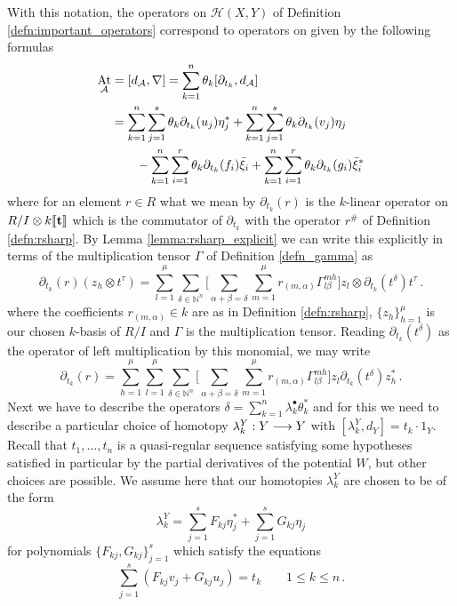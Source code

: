 \documentclass[english,letter paper,12pt,leqno]{article}
\theoremstyle{example}
\numberwithin{equation}{section}
\def\AA{\mathcal{A}}
\def\HH{\HH}
\def\HH{\mathcal{H}}
\def\be{\begin{equation}}
\def\ee{\end{equation}}
\DeclareMathOperator{\vAt}{At}
\begin{document}
With this notation, the operators on $\HH(X,Y)$ of Definition \ref{defn:important_operators} correspond to operators on given by the following formulas
\begin{align}
\vAt_{\AA} &= [ d_{\AA}, \nabla ] = \sum_{k=1}^n \theta_k [ \partial_{t_k}, d_{\AA} ]\nonumber\\
&= \sum_{k=1}^n \sum_{j=1}^s \theta_k \partial_{t_k} (u_j) \eta_j^* + \sum_{k=1}^n \sum_{j=1}^s \theta_k \partial_{t_k}( v_j ) \eta_j\label{eq:vat_formula}\\
& \qquad - \sum_{k=1}^n \sum_{i=1}^r \theta_k \partial_{t_k}(f_i) \Bar{\xi}_i + \sum_{k=1}^n \sum_{i=1}^r \theta_k \partial_{t_k}(g_i) \Bar{\xi}_i^*\nonumber
\end{align}
where for an element $r \in R$ what we mean by $\partial_{t_k}(r)$ is the $k$-linear operator on $R/I \otimes k\llbracket \bold{t} \rrbracket$ which is the commutator of $\partial_{t_k}$ with the operator $r^{\#}$ of Definition \ref{defn:rsharp}. By Lemma \ref{lemma:rsharp_explicit} we can write this explicitly in terms of the multiplication tensor $\Gamma$ of Definition \ref{defn_gamma} as
\be
\partial_{t_k}(r)(z_h \otimes t^{\tau}) = \sum_{l=1}^\mu \sum_{\delta \in \mathbb{N}^n} \Big[ \sum_{\alpha + \beta = \delta } \sum_{m=1}^\mu r_{(m,\alpha)} \Gamma^{mh}_{l\beta} \Big] z_l \otimes \partial_{t_k}(t^\delta) t^{\tau}\,.
\ee
where the coefficients $r_{(m,\alpha)} \in k$ are as in Definition \ref{defn:rsharp}, $\{ z_h \}_{h=1}^\mu$ is our chosen $k$-basis of $R/I$ and $\Gamma$ is the multiplication tensor. Reading $\partial_{t_k}(t^\delta)$ as the operator of left multiplication by this monomial, we may write
\be\label{eq:partial_derivative_op}
\partial_{t_k}(r) = \sum_{h=1}^\mu \sum_{l=1}^\mu \sum_{\delta \in \mathbb{N}^n} \Big[ \sum_{\alpha + \beta = \delta } \sum_{m=1}^\mu r_{(m,\alpha)} \Gamma^{mh}_{l\beta} \Big] z_l \partial_{t_k}(t^\delta) z_h^*\,.
\ee
Next we have to describe the operators $\delta = \sum_{k=1}^n \lambda^\bullet_k \theta_k^*$ and for this we need to describe a particular choice of homotopy $\lambda^Y_k: Y \longrightarrow Y$ with $[ \lambda^Y_k, d_Y ] = t_k \cdot 1_Y$. Recall that $t_1,\ldots,t_n$ is a quasi-regular sequence satisfying some hypotheses satisfied in particular by the partial derivatives of the potential $W$, but other choices are possible. We assume here that our homotopies $\lambda^Y_k$ are chosen to be of the form
\be\label{eq:formula_lambdak_koszul}
\lambda^Y_k = \sum_{j=1}^s F_{kj} \eta_j^* + \sum_{j=1}^s G_{kj} \eta_j
\ee
for polynomials $\{ F_{kj}, G_{kj} \}_{j=1}^s$ which satisfy the equations
\[
\sum_{j=1}^s( F_{kj} v_j + G_{kj} u_j ) = t_k \qquad 1 \le k \le n\,.
\]
\end{document}
